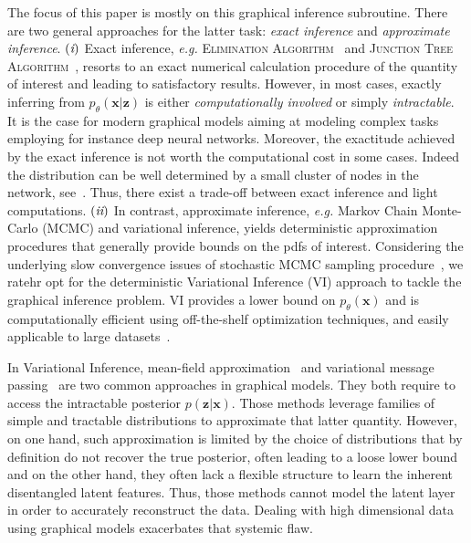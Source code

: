 \documentclass{article} %
\newcommand{\RN}[1]{%
	\textup{\lowercase\expandafter{\it \romannumeral#1}}%
}
\begin{document}
The focus of this paper is mostly on this graphical inference subroutine. 
There are two general approaches for the latter task: \textit{exact inference} and \textit{approximate inference}. $(\RN{1})$ Exact inference, \textit{e.g.} \textsc{Elimination Algorithm}~\citep{sanner2012symbolic} and \textsc{Junction Tree Algorithm}~\citep{kahle2008junction}, resorts to an exact numerical calculation procedure of the quantity of interest and leading to satisfactory results. 
However, in most cases, exactly inferring from $p_{\theta}(\mathbf{x}|\mathbf{z})$ is either \textit{computationally involved} or simply \textit{intractable}. It is the case for modern graphical models aiming at modeling complex tasks employing for instance deep neural networks.
Moreover, the exactitude achieved by the exact inference is not worth the computational cost in some cases.
Indeed the distribution can be well determined by a small cluster of nodes in the network, see~\citep{jordan1999introduction}. Thus, there exist a trade-off between exact inference and light computations. 
$(\RN{2})$ In contrast, approximate inference, \textit{e.g.} Markov Chain Monte-Carlo (MCMC) and variational inference, yields deterministic approximation procedures that generally provide bounds on the pdfs of interest. 
Considering the underlying slow convergence issues of stochastic MCMC sampling procedure~\citep{salimans2015markov}, we ratehr opt for the deterministic Variational Inference (VI) approach to tackle the graphical inference problem.
VI provides a lower bound on $p_{\theta}(\mathbf{x})$ and is computationally efficient using off-the-shelf optimization techniques, and easily applicable to large datasets~\citep{hoffman2013stochastic, kingma2013auto, liu2016stein}.

In Variational Inference, mean-field approximation~\citep{xing2012generalized} and variational message passing~\citep{winn2005variational} are two common approaches in graphical models.
They both require to access the intractable posterior $p(\mathbf{z}|\mathbf{x})$.
Those methods leverage families of simple and tractable distributions to approximate that latter quantity.
However, on one hand, such approximation is limited by the choice of distributions that by definition do not recover the true posterior, often leading to a loose lower bound and on the other hand, they often lack a flexible structure to learn the inherent disentangled latent features. 
Thus, those methods cannot model the latent layer in order to accurately reconstruct the data. 
Dealing with high dimensional data using graphical models exacerbates that systemic flaw.
\end{document}
